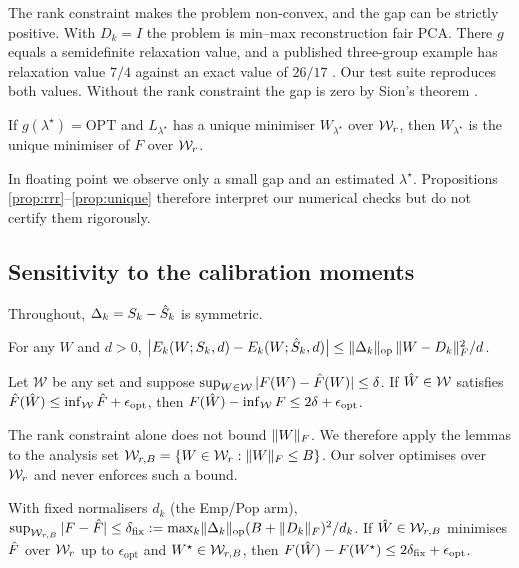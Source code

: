 The rank constraint makes the problem non-convex, and the gap can be strictly positive. With
$D_k=I$ the problem is min--max reconstruction fair PCA. There $g$ equals a semidefinite
relaxation value, and a published three-group example has relaxation value $7/4$ against an exact
value of $26/17$ \citep[Lemma~6.2]{tantipongpipat2019multicriteria}. Our test suite reproduces
both values. Without the rank constraint the gap is zero by Sion's theorem
\citep{sion1958minimax}.

\begin{proposition}[standard]
\label{prop:unique}
If $g(\lambda^\star)=\mathrm{OPT}$ and $L_{\lambda^\star}$ has a unique minimiser $W_{\lambda^\star}$
over $\mathcal{W}_r$, then $W_{\lambda^\star}$ is the unique minimiser of $F$ over $\mathcal{W}_r$.
\end{proposition}

In floating point we observe only a small gap and an estimated $\lambda^\star$. Propositions~
\ref{prop:rrr}--\ref{prop:unique} therefore interpret our numerical checks but do not certify
them rigorously.

\subsection{Sensitivity to the calibration moments}
Throughout, $\Delta_k=S_k-\hat{S}_k$ is symmetric.

\begin{lemma}
\label{lem:pert}
For any $W$ and $d>0$,
$\big|E_k(W;S_k,d)-E_k(W;\hat{S}_k,d)\big|\le\lVert \Delta_k\rVert_{\mathrm{op}}\,\lVert W-D_k\rVert_{F}^2/d$.
\end{lemma}

\begin{lemma}
\label{lem:dev}
Let $\mathcal W$ be any set and suppose $\sup_{W\in\mathcal W}|F(W)-\hat{F}(W)|\le\delta$. If
$\hat{W}\in\mathcal W$ satisfies $\hat{F}(\hat{W})\le\inf_{\mathcal W}\hat{F}+\epsilon_{\mathrm{opt}}$,
then $F(\hat{W})-\inf_{\mathcal W}F\le2\delta+\epsilon_{\mathrm{opt}}$.
\end{lemma}

The rank constraint alone does not bound $\lVert W\rVert_{F}$. We therefore apply the lemmas to the
analysis set $\mathcal{W}_{r,B}=\{W\in\mathcal{W}_r:\lVert W\rVert_{F}\le B\}$. Our solver optimises over $\mathcal{W}_r$ and never
enforces such a bound.

\begin{corollary}
\label{cor:fixed}
With fixed normalisers $d_k$ (the Emp/Pop arm),
$\sup_{\mathcal{W}_{r,B}}|F-\hat{F}|\le\delta_{\mathrm{fix}}:=\max_k\lVert \Delta_k\rVert_{\mathrm{op}}(B+\lVert D_k\rVert_{F})^2/d_k$.
If $\hat{W}\in\mathcal{W}_{r,B}$ minimises $\hat{F}$ over $\mathcal{W}_r$ up to $\epsilon_{\mathrm{opt}}$ and
$W^\star\in\mathcal{W}_{r,B}$, then $F(\hat{W})-F(W^\star)\le2\delta_{\mathrm{fix}}+\epsilon_{\mathrm{opt}}$.
\end{corollary}

